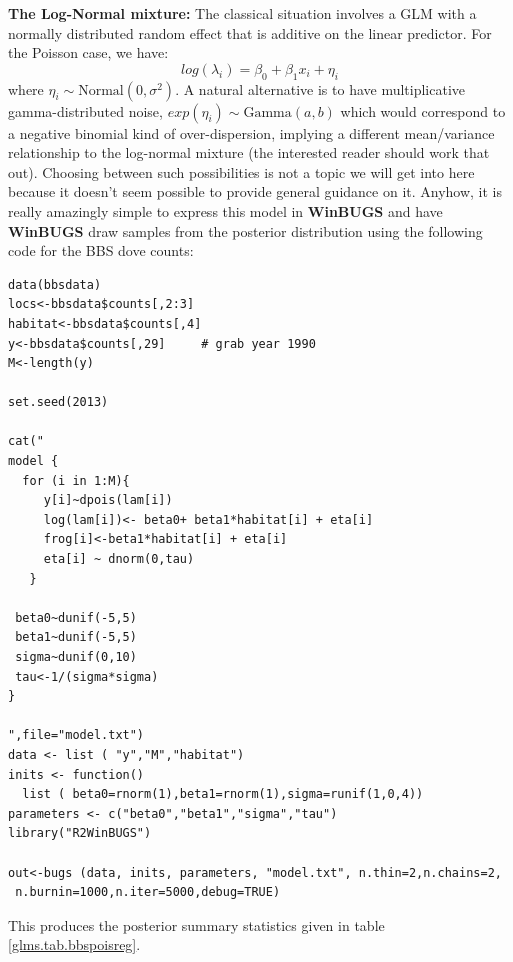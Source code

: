 {\bf The Log-Normal mixture:} The classical situation involves a GLM
with a normally distributed random effect that is additive on the
linear predictor. For the Poisson case, we have:
\[
 	log(\lambda_{i}) = \beta_0  + \beta_1 x_{i} + \eta_{i}
\]
where $\eta_{i} \sim \mbox{Normal}(0,\sigma^{2})$.  A natural
alternative is to have multiplicative gamma-distributed noise,
$exp(\eta_{i}) \sim \mbox{Gamma}(a,b)$ which would correspond to a
negative binomial kind of over-dispersion, implying a different
mean/variance relationship to the log-normal mixture (the interested
reader should work that out).  Choosing between such possibilities is
not a topic we will get into here because it doesn't seem possible to
provide general guidance on it.  
 Anyhow, it is really amazingly simple to
express this model in {\bf WinBUGS} and have {\bf WinBUGS} draw
samples from the posterior distribution using the following code for
the BBS dove counts: 
{\small
\begin{verbatim}
data(bbsdata)
locs<-bbsdata$counts[,2:3]
habitat<-bbsdata$counts[,4]
y<-bbsdata$counts[,29]     # grab year 1990
M<-length(y)

set.seed(2013)

cat("
model {
  for (i in 1:M){
     y[i]~dpois(lam[i])
     log(lam[i])<- beta0+ beta1*habitat[i] + eta[i]
     frog[i]<-beta1*habitat[i] + eta[i]
     eta[i] ~ dnorm(0,tau)
   }

 beta0~dunif(-5,5)
 beta1~dunif(-5,5)
 sigma~dunif(0,10)
 tau<-1/(sigma*sigma)
}

",file="model.txt")
data <- list ( "y","M","habitat")
inits <- function()
  list ( beta0=rnorm(1),beta1=rnorm(1),sigma=runif(1,0,4))
parameters <- c("beta0","beta1","sigma","tau")
library("R2WinBUGS")

out<-bugs (data, inits, parameters, "model.txt", n.thin=2,n.chains=2,
 n.burnin=1000,n.iter=5000,debug=TRUE)
\end{verbatim}
}

This produces the posterior summary statistics given in table \ref{glms.tab.bbspoisreg}. 

